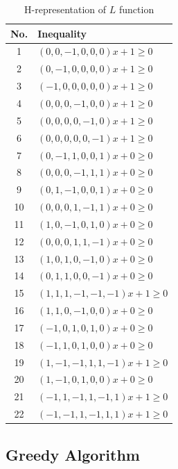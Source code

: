 \begin{table}[h]
\centering
\caption{H-representation of $L$ function}
\begin{tabular}{|c|l|}
\hhline{|=|=|}
\textbf{No.} & \textbf{Inequality} \\ \hline
1  & $(0, 0, -1, 0, 0, 0) x + 1 \geq 0$ \\ \hline
2  & $(0, -1, 0, 0, 0, 0) x + 1 \geq 0$ \\ \hline
3  & $(-1, 0, 0, 0, 0, 0) x + 1 \geq 0$ \\ \hline
4  & $(0, 0, 0, -1, 0, 0) x + 1 \geq 0$ \\ \hline
5  & $(0, 0, 0, 0, -1, 0) x + 1 \geq 0$ \\ \hline
6  & $(0, 0, 0, 0, 0, -1) x + 1 \geq 0$ \\ \hline
7  & $(0, -1, 1, 0, 0, 1) x + 0 \geq 0$ \\ \hline
8  & $(0, 0, 0, -1, 1, 1) x + 0 \geq 0$ \\ \hline
9  & $(0, 1, -1, 0, 0, 1) x + 0 \geq 0$ \\ \hline
10 & $(0, 0, 0, 1, -1, 1) x + 0 \geq 0$ \\ \hline
11 & $(1, 0, -1, 0, 1, 0) x + 0 \geq 0$ \\ \hline
12 & $(0, 0, 0, 1, 1, -1) x + 0 \geq 0$ \\ \hline
13 & $(1, 0, 1, 0, -1, 0) x + 0 \geq 0$ \\ \hline
14 & $(0, 1, 1, 0, 0, -1) x + 0 \geq 0$ \\ \hline
15 & $(1, 1, 1, -1, -1, -1) x + 1 \geq 0$ \\ \hline
16 & $(1, 1, 0, -1, 0, 0) x + 0 \geq 0$ \\ \hline
17 & $(-1, 0, 1, 0, 1, 0) x + 0 \geq 0$ \\ \hline
18 & $(-1, 1, 0, 1, 0, 0) x + 0 \geq 0$ \\ \hline
19 & $(1, -1, -1, 1, 1, -1) x + 1 \geq 0$ \\ \hline
20 & $(1, -1, 0, 1, 0, 0) x + 0 \geq 0$ \\ \hline
21 & $(-1, 1, -1, 1, -1, 1) x + 1 \geq 0$ \\ \hline
22 & $(-1, -1, 1, -1, 1, 1) x + 1 \geq 0$ \\ \hline
\end{tabular}

\label{tab:h-repineq}
\end{table}

\subsection{Greedy Algorithm}


